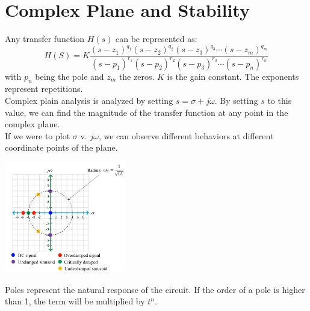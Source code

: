 \documentclass[nobib]{tufte-handout}
\begin{document}
\section{Complex Plane and Stability}
Any transfer function $H(s)$ can be represented as:
\begin{equation*}
    H(S) = K\frac{(s-z_1)^{q_1}(s-z_2)^{q_2}(s-z_3)^{q_3}\cdots(s-z_m)^{q_m}}{(s-p_1)^{r_1}(s-p_2)^{r_2}(s-p_3)^{r_3}\cdots(s-p_n)^{r_n}}
\end{equation*}
with $p_n$ being the pole and $z_m$ the zeros. $K$ is the gain constant. The exponents represent repetitions.\\
Complex plain analysis is analyzed by setting $s=\sigma + j\omega$. By setting $s$ to this value, we can find the magnitude of the transfer function at any point in the complex plane.\\
If we were to plot $\sigma \text{ v. } j\omega$, we can observe different behaviors at different coordinate points of the plane.\\
\begin{center}
    \includegraphics[width = 200px]{images/complex_plane.png}
\end{center}
Poles represent the natural response of the circuit. If the order of a pole is higher than 1, the term will be multiplied by $t^n$.
\begin{center}
\end{center}
\end{document}
